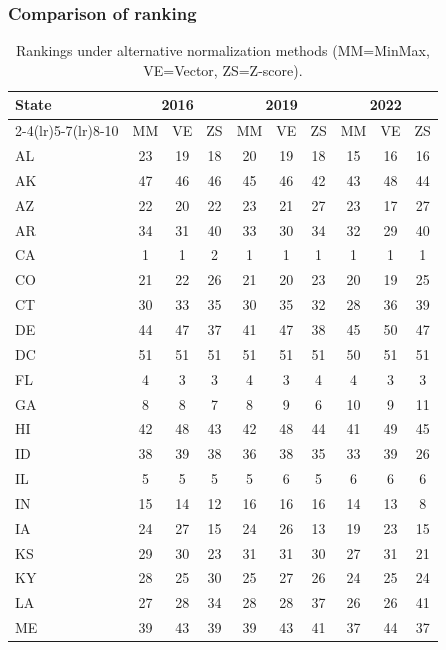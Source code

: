 \documentclass{article}
\newcounter{subsubsubsection}[subsubsection]
\begin{document}
\subsubsection{Comparison of ranking}
\begin{table}[H]
\centering
\caption{Rankings under alternative normalization methods (MM=MinMax, VE=Vector, ZS=Z-score).\label{tab:init-sens}}
\scriptsize
\setlength{\tabcolsep}{2.5pt}
\begin{tabular}{l*{9}{c}}
\toprule
\multirow{2}{*}{State} & \multicolumn{3}{c}{2016} & \multicolumn{3}{c}{2019} & \multicolumn{3}{c}{2022} \\
\cmidrule(lr){2-4}\cmidrule(lr){5-7}\cmidrule(lr){8-10}
 & MM & VE & ZS & MM & VE & ZS & MM & VE & ZS \\
\midrule
AL & 23 & 19 & 18 & 20 & 19 & 18 & 15 & 16 & 16 \\
AK & 47 & 46 & 46 & 45 & 46 & 42 & 43 & 48 & 44 \\
AZ & 22 & 20 & 22 & 23 & 21 & 27 & 23 & 17 & 27 \\
AR & 34 & 31 & 40 & 33 & 30 & 34 & 32 & 29 & 40 \\
CA & 1 & 1 & 2 & 1 & 1 & 1 & 1 & 1 & 1 \\
CO & 21 & 22 & 26 & 21 & 20 & 23 & 20 & 19 & 25 \\
CT & 30 & 33 & 35 & 30 & 35 & 32 & 28 & 36 & 39 \\
DE & 44 & 47 & 37 & 41 & 47 & 38 & 45 & 50 & 47 \\
DC & 51 & 51 & 51 & 51 & 51 & 51 & 50 & 51 & 51 \\
FL & 4 & 3 & 3 & 4 & 3 & 4 & 4 & 3 & 3 \\
GA & 8 & 8 & 7 & 8 & 9 & 6 & 10 & 9 & 11 \\
HI & 42 & 48 & 43 & 42 & 48 & 44 & 41 & 49 & 45 \\
ID & 38 & 39 & 38 & 36 & 38 & 35 & 33 & 39 & 26 \\
IL & 5 & 5 & 5 & 5 & 6 & 5 & 6 & 6 & 6 \\
IN & 15 & 14 & 12 & 16 & 16 & 16 & 14 & 13 & 8 \\
IA & 24 & 27 & 15 & 24 & 26 & 13 & 19 & 23 & 15 \\
KS & 29 & 30 & 23 & 31 & 31 & 30 & 27 & 31 & 21 \\
KY & 28 & 25 & 30 & 25 & 27 & 26 & 24 & 25 & 24 \\
LA & 27 & 28 & 34 & 28 & 28 & 37 & 26 & 26 & 41 \\
ME & 39 & 43 & 39 & 39 & 43 & 41 & 37 & 44 & 37 \\

\end{tabular}
\end{table}
\end{document}
